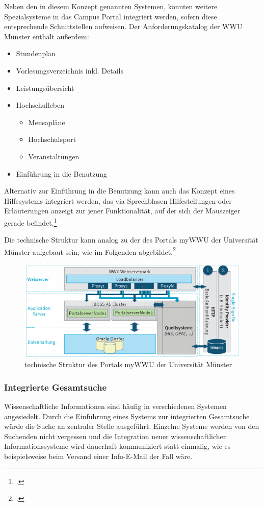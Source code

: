 {{Neben den in diesem Konzept genannten Systemen, könnten weitere Spezialsysteme in das Campus Portal integriert werden, sofern diese entsprechende Schnittstellen aufweisen. Der Anforderungskatalog der WWU Münster enthält außerdem:

\begin{itemize}
	\item Stundenplan
	\item Vorlesungsverzeichnis inkl. Details
	\item Leistungsübersicht
	\item Hochschulleben
	\begin{itemize}
		\item Mensapläne
		\item Hochschulsport
		\item Veranstaltungen
	\end{itemize}
	\item Einführung in die Benutzung
\end{itemize}

Alternativ zur Einführung in die Benutzung kann auch das Konzept eines Hilfesystems integriert werden, das via Sprechblasen Hilfestellungen oder Erläuterungen anzeigt zur jener Funktionalität, auf der sich der Mauszeiger gerade befindet.\footcite[Vgl.][22]{vogl_bericht_2013}

Die technische Struktur kann analog zu der des Portals myWWU der Universität Münster aufgebaut sein, wie im Folgenden abgebildet.\footcite[Vgl.][165]{vogl_fortschritte_2012}
\begin{figure}[h!]
	\centering
	\includegraphics[width=\textwidth]{kapitel/gruppe3/bilder/struktur_mywwu}
	\caption{technische Struktur des Portals myWWU der Universität Münster}
	\label{fig_struktur_mywwu}
\end{figure}
\newpage

\subsubsection{Integrierte Gesamtsuche}
\label{subsubsection_integrierte_gesamtsuche}
Wissenschaftliche Informationen sind häufig in verschiedenen Systemen angesiedelt. Durch die Einführung eines Systems zur integrierten Gesamtsuche würde die Suche an zentraler Stelle ausgeführt. Einzelne Systeme werden von den Suchenden nicht vergessen und die Integration neuer wissenschaftlicher Informationssysteme wird dauerhaft kommuniziert statt einmalig, wie es beispielsweise beim 
Versand einer Info-E-Mail der Fall wäre.

}}
